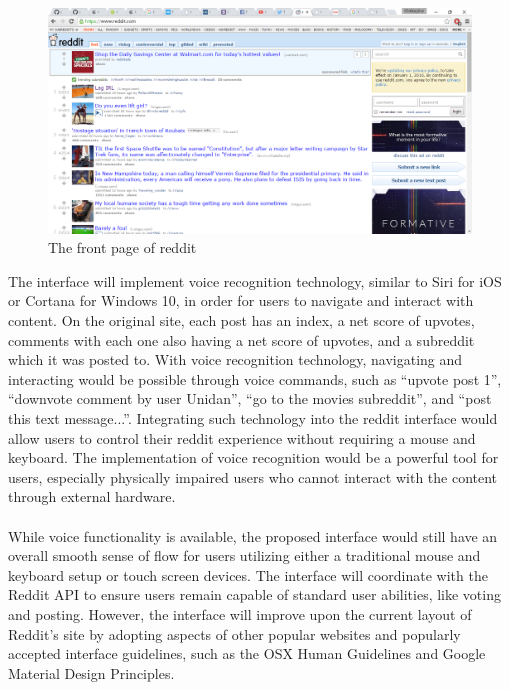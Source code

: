 \documentclass{article}
\begin{document}
\begin{figure}[H]
\begin{center}
\includegraphics[width=1\textwidth]{reddit.png}
\caption{The front page of reddit}
\end{center}
\end{figure}

\indent The interface will implement voice recognition technology, similar to Siri for iOS or Cortana for Windows 10, in order for users to navigate and interact with content. On the original site, each post has an index, a net score of upvotes, comments with each one also having a net score of upvotes, and a subreddit which it was posted to. With voice recognition technology, navigating and interacting would be possible through voice commands, such as ``upvote post 1'', ``downvote comment by user Unidan'', ``go to the movies subreddit'', and ``post this text message...''. Integrating such technology into the reddit interface would allow users to control their reddit experience without requiring a mouse and keyboard. The implementation of voice recognition would be a powerful tool for users, especially physically impaired users who cannot interact with the content through external hardware.\\
\\
\indent While voice functionality is available, the proposed interface would still have an overall smooth sense of flow for users utilizing either a traditional mouse and keyboard setup or touch screen devices. The interface will coordinate with the Reddit API to ensure users remain capable of standard user abilities, like voting and posting. However, the interface will improve upon the current layout of Reddit's site by adopting aspects of other popular websites and popularly accepted interface guidelines, such as the OSX Human Guidelines and Google Material Design Principles.
\end{document}
